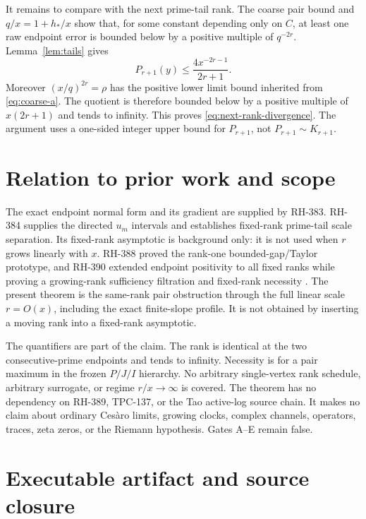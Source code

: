 \documentclass[11pt]{article}
\theoremstyle{definition}
\theoremstyle{remark}
\begin{document}
It remains to compare with the next prime-tail rank.  The coarse pair
bound and $q/x=1+h_*/x$ show that, for some constant depending only on
$C$, at least one raw endpoint error is bounded below by a positive
multiple of $q^{-2r}$.  Lemma~\ref{lem:tails} gives
\[
 P_{r+1}(y)\le\frac{4x^{-2r-1}}{2r+1}.
\]
Moreover $(x/q)^{2r}=\rho$ has the positive lower limit bound inherited
from \eqref{eq:coarse-a}.  The quotient is therefore bounded below by a
positive multiple of $x(2r+1)$ and tends to infinity.  This proves
\eqref{eq:next-rank-divergence}.  The argument uses a one-sided integer
upper bound for $P_{r+1}$, not $P_{r+1}\sim K_{r+1}$.

\section{Relation to prior work and scope}

The exact endpoint normal form and its gradient are supplied by RH-383.
RH-384 supplies the directed $u_m$ intervals and establishes fixed-rank
prime-tail scale separation.  Its fixed-rank asymptotic is background
only: it is not used when $r$ grows linearly with $x$.  RH-388 proved the
rank-one bounded-gap/Taylor prototype, and RH-390 extended endpoint
positivity to all fixed ranks while proving a growing-rank sufficiency
filtration and fixed-rank necessity \cite{RH383,RH384,RH388,RH390}.
The present theorem is the same-rank pair obstruction through the full
linear scale $r=O(x)$, including the exact finite-slope profile.  It is
not obtained by inserting a moving rank into a fixed-rank asymptotic.

The quantifiers are part of the claim.  The rank is identical at the two
consecutive-prime endpoints and tends to infinity.  Necessity is for a
pair maximum in the frozen $P/J/I$ hierarchy.  No arbitrary
single-vertex rank schedule, arbitrary surrogate, or regime
$r/x\to\infty$ is covered.  The theorem has no dependency on RH-389,
TPC-137, or the Tao active-log source chain.  It makes no claim about
ordinary Ces\`aro limits, growing clocks, complex channels, operators,
traces, zeta zeros, or the Riemann hypothesis.  Gates A--E remain false.

\section{Executable artifact and source closure}
\end{document}
